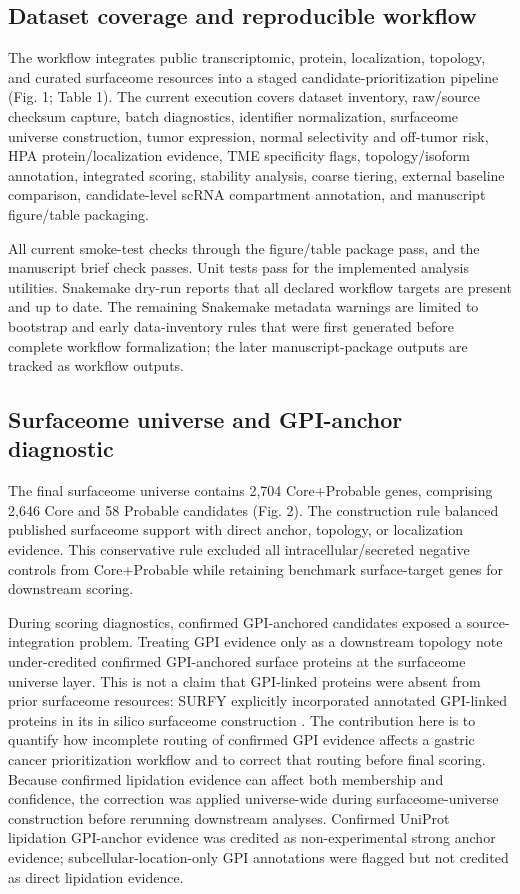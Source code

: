 \documentclass[twocolumn]{article}
\begin{document}
\subsection{Dataset coverage and reproducible workflow}

The workflow integrates public transcriptomic, protein, localization, topology, and curated surfaceome resources into a staged candidate-prioritization pipeline (Fig. 1; Table 1). The current execution covers dataset inventory, raw/\allowbreak{}source checksum capture, batch diagnostics, identifier normalization, surfaceome universe construction, tumor expression, normal selectivity and off-tumor risk, HPA protein/\allowbreak{}localization evidence, TME specificity flags, topology/\allowbreak{}isoform annotation, integrated scoring, stability analysis, coarse tiering, external baseline comparison, candidate-level scRNA compartment annotation, and manuscript figure/\allowbreak{}table packaging.

All current smoke-test checks through the figure/\allowbreak{}table package pass, and the manuscript brief check passes. Unit tests pass for the implemented analysis utilities. Snakemake dry-run reports that all declared workflow targets are present and up to date. The remaining Snakemake metadata warnings are limited to bootstrap and early data-inventory rules that were first generated before complete workflow formalization; the later manuscript-package outputs are tracked as workflow outputs.

\subsection{Surfaceome universe and GPI-anchor diagnostic}

The final surfaceome universe contains 2,704 Core+\allowbreak{}Probable genes, comprising 2,646 Core and 58 Probable candidates (Fig. 2). The construction rule balanced published surfaceome support with direct anchor, topology, or localization evidence. This conservative rule excluded all intracellular/\allowbreak{}secreted negative controls from Core+\allowbreak{}Probable while retaining benchmark surface-target genes for downstream scoring.

During scoring diagnostics, confirmed GPI-anchored candidates exposed a source-integration problem. Treating GPI evidence only as a downstream topology note under-credited confirmed GPI-anchored surface proteins at the surfaceome universe layer. This is not a claim that GPI-linked proteins were absent from prior surfaceome resources: SURFY explicitly incorporated annotated GPI-linked proteins in its in silico surfaceome construction \cite{bauschfluck2018surfy}. The contribution here is to quantify how incomplete routing of confirmed GPI evidence affects a gastric cancer prioritization workflow and to correct that routing before final scoring. Because confirmed lipidation evidence can affect both membership and confidence, the correction was applied universe-wide during surfaceome-universe construction before rerunning downstream analyses. Confirmed UniProt lipidation GPI-anchor evidence was credited as non-experimental strong anchor evidence; subcellular-location-only GPI annotations were flagged but not credited as direct lipidation evidence.
\end{document}
